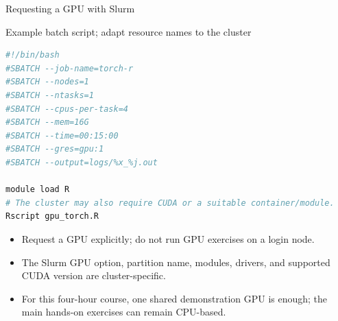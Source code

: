 \begin{frame}[fragile]{Requesting a GPU with Slurm}
\begin{block}{Example batch script; adapt resource names to the cluster}
\begin{lstlisting}[language=bash,basicstyle=\ttfamily\scriptsize]
#!/bin/bash
#SBATCH --job-name=torch-r
#SBATCH --nodes=1
#SBATCH --ntasks=1
#SBATCH --cpus-per-task=4
#SBATCH --mem=16G
#SBATCH --time=00:15:00
#SBATCH --gres=gpu:1
#SBATCH --output=logs/%x_%j.out

module load R
# The cluster may also require CUDA or a suitable container/module.
Rscript gpu_torch.R
\end{lstlisting}
\end{block}
\begin{itemize}
  \item Request a GPU explicitly; do not run GPU exercises on a login node.
  \item The Slurm GPU option, partition name, modules, drivers, and supported CUDA version are cluster-specific.
  \item For this four-hour course, one shared demonstration GPU is enough; the main hands-on exercises can remain CPU-based.
\end{itemize}
\end{frame}
